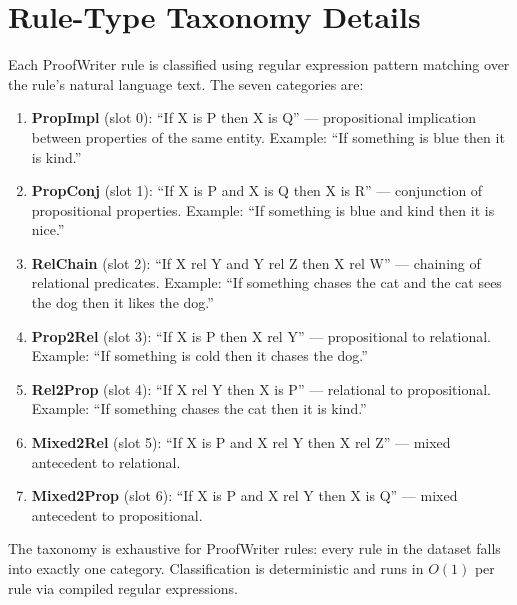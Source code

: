 \documentclass[conference]{IEEEtran}
\begin{document}
\section{Rule-Type Taxonomy Details}
\label{app:taxonomy}

Each ProofWriter rule is classified using regular expression
pattern matching over the rule's natural language text. The
seven categories are:

\begin{enumerate}[nosep]
    \item \textbf{PropImpl} (slot 0): ``If X is P then X is Q''
          --- propositional implication between properties of the
          same entity.  Example: ``If something is blue then it
          is kind.''
    \item \textbf{PropConj} (slot 1): ``If X is P and X is Q
          then X is R'' --- conjunction of propositional
          properties.  Example: ``If something is blue and kind
          then it is nice.''
    \item \textbf{RelChain} (slot 2): ``If X rel Y and Y rel Z
          then X rel W'' --- chaining of relational predicates.
          Example: ``If something chases the cat and the cat
          sees the dog then it likes the dog.''
    \item \textbf{Prop2Rel} (slot 3): ``If X is P then X rel Y''
          --- propositional to relational.  Example: ``If
          something is cold then it chases the dog.''
    \item \textbf{Rel2Prop} (slot 4): ``If X rel Y then X is P''
          --- relational to propositional.  Example: ``If
          something chases the cat then it is kind.''
    \item \textbf{Mixed2Rel} (slot 5): ``If X is P and X rel Y
          then X rel Z'' --- mixed antecedent to relational.
    \item \textbf{Mixed2Prop} (slot 6): ``If X is P and X rel Y
          then X is Q'' --- mixed antecedent to propositional.
\end{enumerate}

The taxonomy is exhaustive for ProofWriter rules: every rule in
the dataset falls into exactly one category. Classification is
deterministic and runs in $O(1)$ per rule via compiled regular
expressions.




\end{document}
